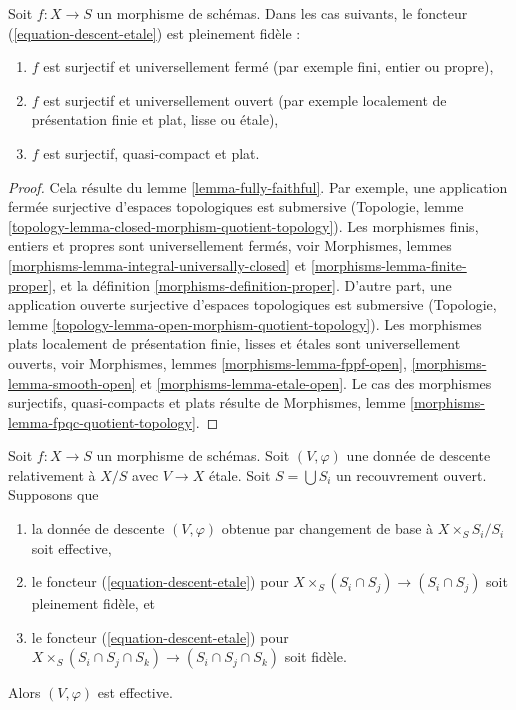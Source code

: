 \begin{lemma}
\label{lemma-fully-faithful-cases}
Soit $f : X \to S$ un morphisme de schémas. Dans les cas suivants,
le foncteur (\ref{equation-descent-etale}) est pleinement fidèle :
\begin{enumerate}
\item $f$ est surjectif et universellement fermé
(par exemple fini, entier ou propre),
\item $f$ est surjectif et universellement ouvert
(par exemple localement de présentation finie et plat, lisse ou étale),
\item $f$ est surjectif, quasi-compact et plat.
\end{enumerate}
\end{lemma}

\begin{proof}
Cela résulte du lemme \ref{lemma-fully-faithful}.
Par exemple, une application fermée surjective d'espaces topologiques
est submersive (Topologie, lemme
\ref{topology-lemma-closed-morphism-quotient-topology}).
Les morphismes finis, entiers et propres sont universellement fermés, voir
Morphismes, lemmes \ref{morphisms-lemma-integral-universally-closed} et
\ref{morphisms-lemma-finite-proper}, et
la définition \ref{morphisms-definition-proper}.
D'autre part, une application ouverte surjective d'espaces topologiques
est submersive (Topologie, lemme
\ref{topology-lemma-open-morphism-quotient-topology}).
Les morphismes plats localement de présentation finie, lisses et \'etales sont
universellement ouverts, voir
Morphismes, lemmes \ref{morphisms-lemma-fppf-open},
\ref{morphisms-lemma-smooth-open} et
\ref{morphisms-lemma-etale-open}.
Le cas des morphismes surjectifs, quasi-compacts et plats résulte
de Morphismes, lemme \ref{morphisms-lemma-fpqc-quotient-topology}.
\end{proof}

\begin{lemma}
\label{lemma-reduce-to-affine}
Soit $f : X \to S$ un morphisme de schémas.
Soit $(V, \varphi)$ une donnée de descente relativement à $X/S$
avec $V \to X$ \'etale. Soit $S = \bigcup S_i$ un
recouvrement ouvert. Supposons que
\begin{enumerate}
\item la donnée de descente $(V, \varphi)$ obtenue par changement de base
à $X \times_S S_i/S_i$ soit effective,
\item le foncteur (\ref{equation-descent-etale})
pour $X \times_S (S_i \cap S_j) \to (S_i \cap S_j)$ soit pleinement fidèle, et
\item le foncteur (\ref{equation-descent-etale})
pour $X \times_S (S_i \cap S_j \cap S_k) \to (S_i \cap S_j \cap S_k)$
soit fidèle.
\end{enumerate}
Alors $(V, \varphi)$ est effective.
\end{lemma}

